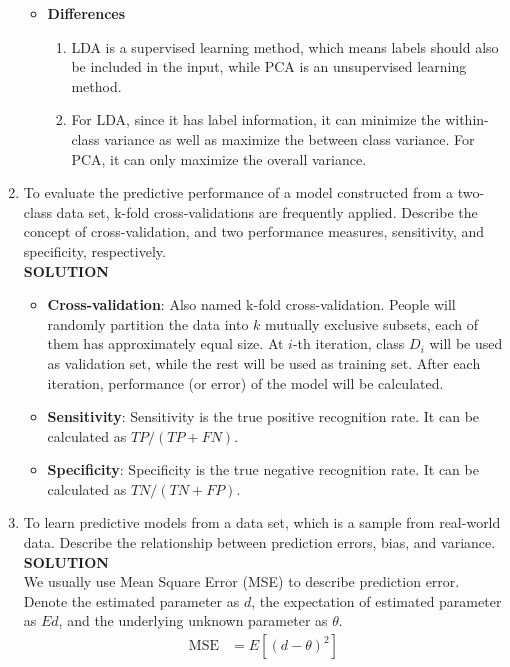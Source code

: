 \documentclass{article}
\begin{document}
\begin{enumerate}
\begin{itemize}
        \item \textbf{Differences}
        \begin{enumerate}
            \item LDA is a supervised learning method, which means labels should also be included in the input, while PCA is an unsupervised learning method.
            \item For LDA, since it has label information, it can minimize the within-class variance as well as maximize the between class variance. For PCA, it can only maximize the overall variance.
        \end{enumerate}
    \end{itemize}
    \item To evaluate the predictive performance of a model constructed from a two-class data set, k-fold cross-validations are frequently applied. Describe the concept of cross-validation, and two performance measures, sensitivity, and specificity, respectively.\\
    \textbf{SOLUTION}
    \begin{itemize}
        \item \textbf{Cross-validation}: Also named k-fold cross-validation. People will randomly partition the data into $k$ mutually exclusive subsets, each of them has approximately equal size. At $i$-th iteration, class $D_i$ will be used as validation set, while the rest will be used as training set. After each iteration, performance (or error) of the model will be calculated. 
        \item \textbf{Sensitivity}: Sensitivity is the true positive recognition rate. It can be calculated as $TP/(TP+FN)$.
        \item \textbf{Specificity}: Specificity is the true negative recognition rate. It can be calculated as $TN/(TN+FP)$.
    \end{itemize}
    \item To learn predictive models from a data set, which is a sample from real-world data. Describe the relationship between prediction errors, bias, and variance.\\
    \textbf{SOLUTION}\\
    We usually use Mean Square Error (MSE) to describe prediction error. Denote the estimated parameter as $d$, the expectation of estimated parameter as $Ed$, and the underlying unknown parameter as $\theta$.
    $$
    \begin{aligned}
        \text{MSE}&=E\left[(d-\theta)^2\right]\\

\end{aligned}$$
\end{enumerate}
\end{document}
